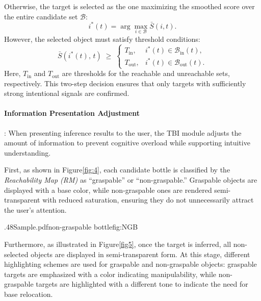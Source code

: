 \documentclass[../../main.tex]{subfiles} %
\begin{document}
Otherwise, the target is selected as the one maximizing 
the smoothed score over the entire candidate set $\mathcal{B}$:
\begin{equation}
i^*(t) = \arg\max_{i \in \mathcal{B}} \bar{S}(i,t).
\end{equation}
However, the selected object must satisfy threshold conditions:
\begin{equation}
  \bar{S}\!\left(i^{*}(t),\,t\right) \;\geq\;
  \begin{cases}
    T_{\text{in}},  & i^{*}(t) \in \mathcal{B}_{\text{in}}(t), \\[6pt]
    T_{\text{out}}, & i^{*}(t) \in \mathcal{B}_{\text{out}}(t).
  \end{cases}
\end{equation}
Here, $T_{\text{in}}$ and $T_{\text{out}}$ are thresholds for the reachable and unreachable sets, respectively.  
This two-step decision ensures that only targets with sufficiently strong intentional signals are confirmed.

\paragraph{Information Presentation Adjustment}:  
When presenting inference results to the user,  
the TBI module adjusts the amount of information to prevent cognitive 
overload while supporting intuitive understanding.  

First, as shown in Figure\ref{fig:4}, each candidate bottle is classified by 
the \textit{Reachability Map (RM)} as “graspable” or “non-graspable.”  
Graspable objects are displayed with a base color\cite{RM},  
while non-graspable ones are rendered semi-transparent with reduced saturation,  
ensuring they do not unnecessarily attract the user’s attention.  

{.48\linewidth}{Sample.pdf}{non-graspable bottle}{fig:NGB}
\label{fig:4}

Furthermore, as illustrated in Figure\ref{fig5},  
once the target is inferred, all non-selected objects are displayed in semi-transparent form.  
At this stage, different highlighting schemes are used for graspable and non-graspable objects:  
graspable targets are emphasized with a color indicating manipulability,  
while non-graspable targets are highlighted with a different tone to indicate the need for base relocation.  
\end{document}
